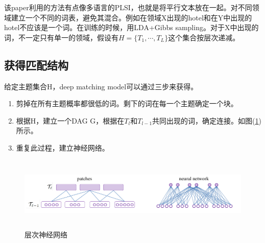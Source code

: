 \documentclass[12pt,a4paper,titlepage]{article}
\begin{document}
该paper利用的方法有点像多语言的PLSI，也就是将平行文本放在一起。对不同领域建立一个不同的词表，避免其混合。例如在领域X出现的hotel和在Y中出现的hotel不应该是一个词。在训练的时候，用LDA+Gibbs sampling。对于X中出现的词，不一定只有单一的领域，假设有$H=\{T_1,\cdots ,T_L\}$这个集合按层次递减。

\subsection{获得匹配结构}

给定主题集合H，deep matching model可以通过三步来获得。
\begin{enumerate}
\item 剪掉在所有主题概率都很低的词。剩下的词在每一个主题确定一个块。
\item 根据H，建立一个DAG G，根据在$T_l 和T_{l-1}$共同出现的词，确定连接。如图(\ref{fig:hir})所示。
\item 重复此过程，建立神经网络。
\end{enumerate}

\begin{figure}
  \centering
  \includegraphics[height=3.5cm,width=14cm]{hir.png}
  \caption{层次神经网络}
  \label{fig:hir}
\end{figure}
\end{document}
